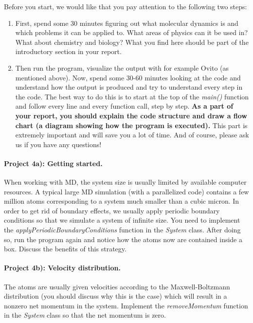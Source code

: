 \documentclass[%
oneside,                 %
final,                   %
10pt]{article}
\begin{document}
Before you start, we would like that you pay attention to the following two steps:
\begin{enumerate}
 \item First, spend some 30 minutes figuring out what molecular dynamics is and which problems it can be applied to. What areas of physics can it be used in? What about chemistry and biology? What you find here should be part of the  introductory section in your report.

 \item Then run the program, visualize the output with for example Ovito (as mentioned above). Now, spend some 30-60 minutes looking at the code and understand how the output is produced and try to understand every step in the code. The best way to do this is to start at the top of the \emph{main()} function and follow every line and every function call, step by step. \textbf{As a part of your report, you should explain the code structure and draw a flow chart (a diagram showing how the program is executed).} This part is extremely important and will save you a lot of time. And of course, please ask us if you have any questions!
\end{enumerate}

\noindent
\paragraph{Project 4a): Getting started.}
When working with MD, the system size is usually limited by available computer resources. A typical large MD simulation (with a parallelized code) contains a few million atoms corresponding to a system much smaller than a cubic micron. In order to get rid of boundary effects, we usually apply periodic boundary conditions so that we simulate a system of infinite size. You need to implement the \emph{applyPeriodicBoundaryConditions} function in the \emph{System} class. After doing so, run the program again and notice how the atoms now are contained inside a box. Discuss the benefits of this strategy.

\paragraph{Project 4b): Velocity distribution.}
The atoms are usually given velocities according to the Maxwell-Boltzmann distribution (you should discuss why this is the case) which will result in a nonzero net momentum in the system. Implement the \emph{removeMomentum} function in the \emph{System} class so that the net momentum is zero.
\end{document}
